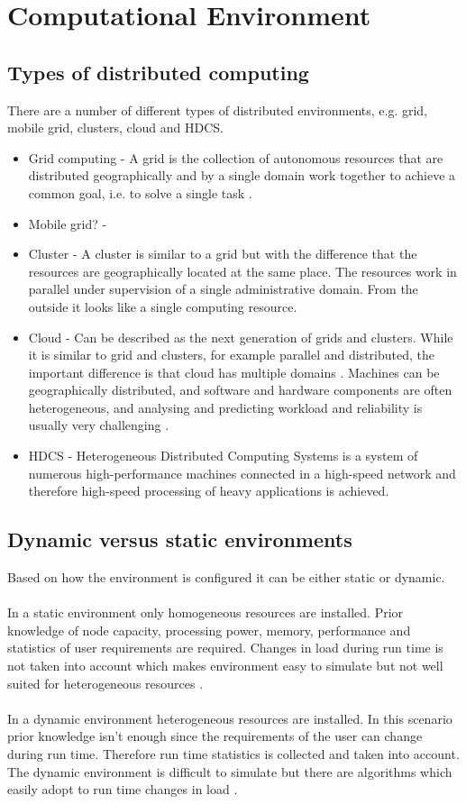 \documentclass{cslthse-msc}
\begin{document}
\section{Computational Environment}
\subsection{Types of distributed computing}
There are a number of different types of distributed environments, e.g. grid, mobile grid, clusters, cloud and HDCS.
\begin{itemize}
\item Grid computing - A grid is the collection of autonomous resources that are distributed geographically and by a single domain work together to achieve a common goal, i.e. to solve a single task \cite{compStudyLoadAndCloud}.
\item Mobile grid? - %
\item Cluster - A cluster is similar to a grid but with the difference that the resources are geographically located at the same place. The resources work in parallel under supervision of a single administrative domain. From the outside it looks like a single computing resource. \cite{compStudyLoadAndCloud}
\item Cloud - Can be described as the next generation of grids and clusters. While it is similar to grid and clusters, for example parallel and distributed, the important difference is that cloud has multiple domains \cite{compStudyLoadAndCloud}. Machines can be geographically distributed, and software and hardware components are often heterogeneous, and analysing and predicting workload and reliability is usually very challenging \cite{surveyReliabilityDistr}. 
\item HDCS - Heterogeneous Distributed Computing Systems is a system of numerous high-performance machines connected in a high-speed network and therefore high-speed processing of heavy applications is achieved.
\end{itemize}

\subsection{Dynamic versus static environments}
Based on how the environment is configured it can be either static or dynamic. 
\\\\
In a static environment only homogeneous resources are installed. Prior knowledge of node capacity, processing power, memory, performance and statistics of user requirements are required. Changes in load during run time is not taken into account which makes environment easy to simulate but not well suited for heterogeneous resources \cite{compStudyLoadAndCloud}.
\\\\
In a dynamic environment heterogeneous resources are installed. In this scenario prior knowledge isn't enough since the requirements of the user can change during run time. Therefore run time statistics is collected and taken into account. The dynamic environment is difficult to simulate but there are algorithms which easily adopt to run time changes in load \cite{compStudyLoadAndCloud}.
\end{document}
